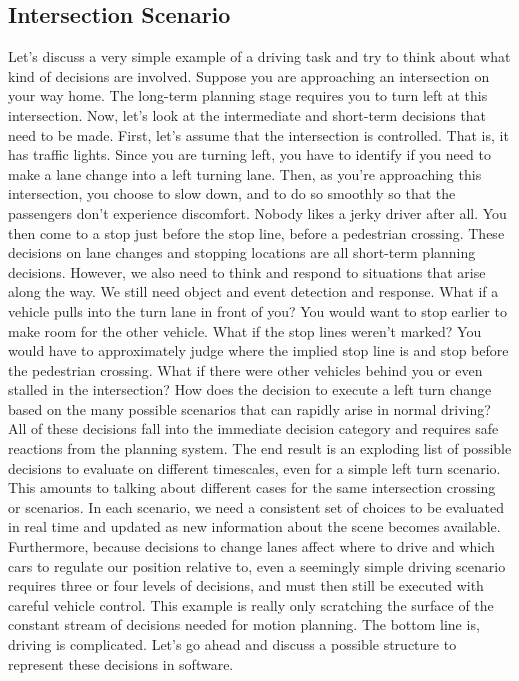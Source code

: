 \subsection{Intersection Scenario}

Let's discuss a very simple example of a driving task and try to think about what kind of decisions are involved. Suppose you are approaching an intersection on your way home. 
The long-term planning stage requires you to turn left at this intersection. 
Now, let's look at the intermediate and short-term decisions that need to be made. 
First, let's assume that the intersection is controlled. 
That is, it has traffic lights. Since you are turning left, you have to identify if you need to make a lane change into a left turning lane. 
Then, as you're approaching this intersection, you choose to slow down, and to do so smoothly so that the passengers don't experience discomfort. 
Nobody likes a jerky driver after all. You then come to a stop just before the stop line, before a pedestrian crossing. 
These decisions on lane changes and stopping locations are all short-term planning decisions. 
However, we also need to think and respond to situations that arise along the way. 
We still need object and event detection and response. 
What if a vehicle pulls into the turn lane in front of you? You would want to stop earlier to make room for the other vehicle. 
What if the stop lines weren't marked? You would have to approximately judge where the implied stop line is and stop before the pedestrian crossing. 
What if there were other vehicles behind you or even stalled in the intersection? 
How does the decision to execute a left turn change based on the many possible scenarios that can rapidly arise in normal driving? 
All of these decisions fall into the immediate decision category and requires safe reactions from the planning system. 
The end result is an exploding list of possible decisions to evaluate on different timescales, even for a simple left turn scenario. 
This amounts to talking about different cases for the same intersection crossing or scenarios. 
In each scenario, we need a consistent set of choices to be evaluated in real time and updated as new information about the scene becomes available. 
Furthermore, because decisions to change lanes affect where to drive and which cars to regulate our position relative to, 
even a seemingly simple driving scenario requires three or four levels of decisions, and must then still be executed with careful vehicle control. 
This example is really only scratching the surface of the constant stream of decisions needed for motion planning. 
The bottom line is, driving is complicated. Let's go ahead and discuss a possible structure to represent these decisions in software. 



